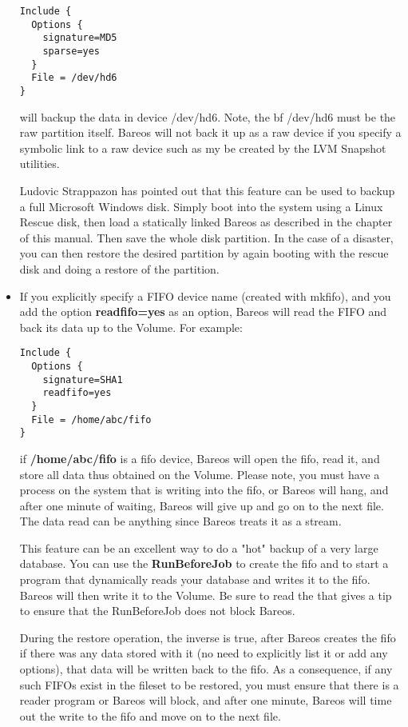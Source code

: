 \begin{itemize}
\footnotesize
\begin{verbatim}
Include {
  Options {
    signature=MD5
    sparse=yes
  }
  File = /dev/hd6
}
\end{verbatim}
\normalsize

   will backup the data in device /dev/hd6. Note, the {bf /dev/hd6} must be
   the raw partition itself. Bareos will not back it up as a raw device if
   you specify a symbolic link to a raw device such as my be created by the
   LVM Snapshot utilities.

   Ludovic Strappazon has pointed out that this feature can be  used to backup a
   full Microsoft Windows disk. Simply boot into  the system using a Linux Rescue
   disk, then load a statically  linked Bareos as described in the
    chapter of
   this manual. Then  save the whole disk partition. In the case of a disaster,
   you  can then restore the desired partition by again booting with  the rescue
   disk and doing a restore of the partition.
   \item If you explicitly specify a FIFO device name (created with mkfifo),  and
   you add the option {\bf readfifo=yes} as an option, Bareos  will read the FIFO
   and back its data up to the Volume. For  example:

\footnotesize
\begin{verbatim}
Include {
  Options {
    signature=SHA1
    readfifo=yes
  }
  File = /home/abc/fifo
}
\end{verbatim}
\normalsize

   if {\bf /home/abc/fifo} is a fifo device, Bareos will open the fifo,
   read it, and store all data thus obtained on the Volume.  Please note,
   you must have a process on the system that is writing into the fifo, or
   Bareos will hang, and after one minute of waiting, Bareos will give up
   and go on to the next file.  The data read can be anything since Bareos
   treats it as a stream.

   This feature can be an excellent way to do a "hot" backup of a very
   large database.  You can use the {\bf RunBeforeJob} to create the fifo
   and to start a program that dynamically reads your database and writes
   it to the fifo.  Bareos will then write it to the Volume.  Be sure to
   read the  that gives a
   tip to ensure that the RunBeforeJob does not block Bareos.

   During the restore operation, the inverse is true, after Bareos creates
   the fifo if there was any data stored with it (no need to explicitly
   list it or add any options), that data will be written back to the fifo.
   As a consequence, if any such FIFOs exist in the fileset to be restored,
   you must ensure that there is a reader program or Bareos will block, and
   after one minute, Bareos will time out the write to the fifo and move on
   to the next file.


\end{itemize}
